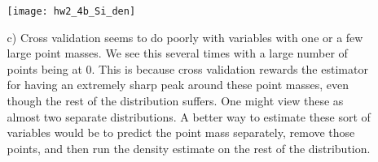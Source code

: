 \documentclass[11pt]{article}
\theoremstyle{definition}
\begin{document}
\begin{itemize}
\begin{itemize}
                \texttt{[image: hw2\_4b\_Si\_den]}  \\
            \item[c)]
                Cross validation seems to do poorly with variables with one or a few large point masses. We see this several times with a large number of points being at $0$. This is because cross validation rewards the estimator for having an extremely sharp peak around these point masses, even though the rest of the distribution suffers. One might view these as almost two separate distributions. A better way to estimate these sort of variables would be to predict the point mass separately, remove those points, and then run the density estimate on the rest of the distribution.


        \end{itemize}                                          
\end{itemize}
\end{document}
